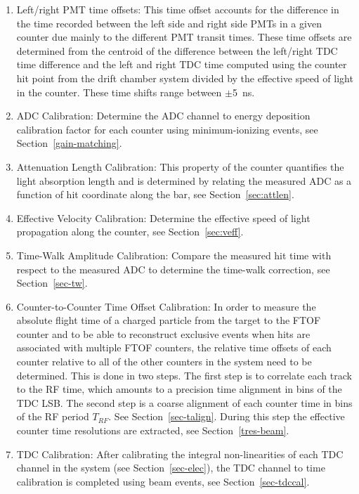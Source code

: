 \documentclass{elsart}
\begin{document}
\begin{enumerate}
\item Left/right PMT time offsets: This time offset accounts for the difference in the time recorded
between the left side and right side PMTs in a given counter due mainly to the different PMT transit times.
These time offsets are determined from the centroid of the difference between the left/right TDC time
difference and the left and right TDC time computed using the counter hit point from the drift chamber
system divided by the effective speed of light in the counter. These time shifts range between $\pm$5~ns.

\item ADC Calibration: Determine the ADC channel to energy deposition calibration factor for each counter
using minimum-ionizing events, see Section~\ref{gain-matching}.

\item Attenuation Length Calibration: This property of the counter quantifies the light absorption length and
is determined by relating the measured ADC as a function of hit coordinate along the bar, see
Section~\ref{sec:attlen}.

\item Effective Velocity Calibration: Determine the effective speed of light propagation along the counter,
see Section~\ref{sec:veff}.

\item Time-Walk Amplitude Calibration: Compare the measured hit time with respect to the measured ADC
to determine the time-walk correction, see Section~\ref{sec-tw}.
  
\item Counter-to-Counter Time Offset Calibration: In order to measure the absolute flight time of a charged
particle from the target to the FTOF counter and to be able to reconstruct exclusive events when hits are
associated with multiple FTOF counters, the relative time offsets of each counter relative to all of the other
counters in the system need to be determined. This is done in two steps. The first step is to correlate each
track to the RF time, which amounts to a precision time alignment in bins of the TDC LSB. The second step is
a coarse alignment of each counter time in bins of the RF period $T_{RF}$. See Section~\ref{sec-talign}.
During this step the effective counter time resolutions are extracted, see Section~\ref{tres-beam}.

\item TDC Calibration: After calibrating the integral non-linearities of each TDC channel in the system (see
Section~\ref{sec-elec}), the TDC channel to time calibration is completed using beam events, see
Section~\ref{sec-tdccal}.

\end{enumerate}
\end{document}

